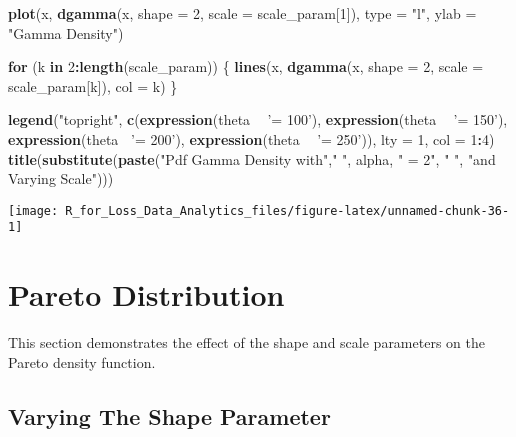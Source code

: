 \documentclass[]{book}
\newenvironment{Shaded}{\begin{snugshade}}{\end{snugshade}}
\newcommand{\KeywordTok}[1]{\textcolor[rgb]{0.13,0.29,0.53}{\textbf{#1}}}
\newcommand{\DataTypeTok}[1]{\textcolor[rgb]{0.13,0.29,0.53}{#1}}
\newcommand{\DecValTok}[1]{\textcolor[rgb]{0.00,0.00,0.81}{#1}}
\newcommand{\StringTok}[1]{\textcolor[rgb]{0.31,0.60,0.02}{#1}}
\newcommand{\ControlFlowTok}[1]{\textcolor[rgb]{0.13,0.29,0.53}{\textbf{#1}}}
\newcommand{\OperatorTok}[1]{\textcolor[rgb]{0.81,0.36,0.00}{\textbf{#1}}}
\newcommand{\NormalTok}[1]{#1}
\theoremstyle{definition}
\theoremstyle{definition}
\theoremstyle{definition}
\theoremstyle{remark}
\begin{document}
\begin{Shaded}
\begin{Highlighting}[]
\KeywordTok{plot}\NormalTok{(x, }\KeywordTok{dgamma}\NormalTok{(x, }\DataTypeTok{shape =} \DecValTok{2}\NormalTok{, }\DataTypeTok{scale =}\NormalTok{ scale_param[}\DecValTok{1}\NormalTok{]), }\DataTypeTok{type =} \StringTok{"l"}\NormalTok{, }\DataTypeTok{ylab =} \StringTok{"Gamma Density"}\NormalTok{)}

\ControlFlowTok{for}\NormalTok{ (k }\ControlFlowTok{in} \DecValTok{2}\OperatorTok{:}\KeywordTok{length}\NormalTok{(scale_param)) \{}
  \KeywordTok{lines}\NormalTok{(x, }\KeywordTok{dgamma}\NormalTok{(x, }\DataTypeTok{shape =} \DecValTok{2}\NormalTok{, }\DataTypeTok{scale =}\NormalTok{ scale_param[k]), }\DataTypeTok{col =}\NormalTok{ k)}
\NormalTok{\}}

\KeywordTok{legend}\NormalTok{(}\StringTok{"topright"}\NormalTok{, }\KeywordTok{c}\NormalTok{(}\KeywordTok{expression}\NormalTok{(theta }\OperatorTok{~}\StringTok{ '= 100'}\NormalTok{), }\KeywordTok{expression}\NormalTok{(theta }\OperatorTok{~}\StringTok{ '= 150'}\NormalTok{), }
                     \KeywordTok{expression}\NormalTok{(theta }\OperatorTok{~}\StringTok{'= 200'}\NormalTok{), }\KeywordTok{expression}\NormalTok{(theta }\OperatorTok{~}\StringTok{ '= 250'}\NormalTok{)), }
       \DataTypeTok{lty =} \DecValTok{1}\NormalTok{, }\DataTypeTok{col =} \DecValTok{1}\OperatorTok{:}\DecValTok{4}\NormalTok{)}
\KeywordTok{title}\NormalTok{(}\KeywordTok{substitute}\NormalTok{(}\KeywordTok{paste}\NormalTok{(}\StringTok{"Pdf Gamma Density with"}\NormalTok{,}\StringTok{" "}\NormalTok{, alpha, }\StringTok{" = 2"}\NormalTok{, }\StringTok{" "}\NormalTok{, }
                       \StringTok{"and Varying Scale"}\NormalTok{)))}
\end{Highlighting}
\end{Shaded}

\begin{center}\texttt{[image: R\_for\_Loss\_Data\_Analytics\_files/figure-latex/unnamed-chunk-36-1]} \end{center}

\section{Pareto Distribution}\label{pareto-distribution}

This section demonstrates the effect of the shape and scale parameters
on the Pareto density function.

\subsection{Varying The Shape
Parameter}\label{varying-the-shape-parameter-1}
\end{document}
